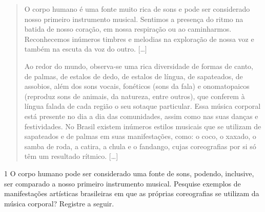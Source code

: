\begin{quote}
O corpo humano é uma fonte muito rica de sons e pode ser considerado
nosso primeiro instrumento musical. Sentimos a presença do ritmo na
batida de nosso coração, em nossa respiração ou ao caminharmos.
Reconhecemos inúmeros timbres e melodias na exploração de nossa voz e
também na escuta da voz do outro. {[}\ldots{}{]}

Ao redor do mundo, observa-se uma rica diversidade de formas de canto,
de palmas, de estalos de dedo, de estalos de língua, de sapateados, de
assobios, além dos sons vocais, fonéticos (sons da fala) e onomatopaicos
(reproduz sons de animais, da natureza, entre outros), que conferem à
língua falada de cada região o seu sotaque particular. Essa música
corporal está presente no dia a dia das comunidades, assim como nas suas
danças e festividades. No Brasil existem inúmeros estilos musicais que
se utilizam de sapateados e de palmas em suas manifestações, como: o
coco, o xaxado, o samba de roda, a catira, a chula e o fandango, cujas
coreografias por si só têm um resultado rítmico. {[}\ldots{}{]}

\end{quote}

\num{1}  O corpo humano pode ser considerado uma fonte de sons, podendo, inclusive, ser comparado a nosso primeiro instrumento musical. Pesquise exemplos de manifestações artísticas brasileiras
  em que as próprias coreografias se utilizam da música corporal? Registre a seguir.



